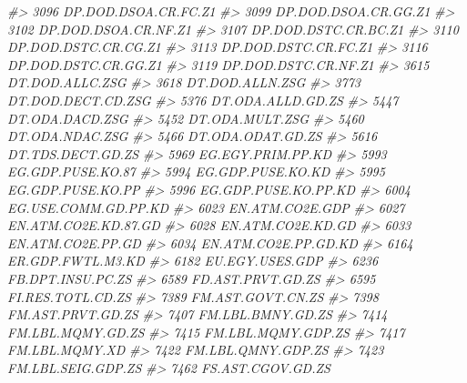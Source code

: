 \documentclass[
]{bxjsbook}
\newenvironment{Shaded}{\begin{snugshade}}{\end{snugshade}}
\newcommand{\CommentTok}[1]{\textcolor[rgb]{0.56,0.35,0.01}{\textit{#1}}}
\theoremstyle{definition}
\theoremstyle{definition}
\theoremstyle{definition}
\theoremstyle{definition}
\theoremstyle{remark}
\begin{document}
\begin{Shaded}
\begin{Highlighting}[]
\CommentTok{\#\textgreater{} 3096        DP.DOD.DSOA.CR.FC.Z1}
\CommentTok{\#\textgreater{} 3099        DP.DOD.DSOA.CR.GG.Z1}
\CommentTok{\#\textgreater{} 3102        DP.DOD.DSOA.CR.NF.Z1}
\CommentTok{\#\textgreater{} 3107        DP.DOD.DSTC.CR.BC.Z1}
\CommentTok{\#\textgreater{} 3110        DP.DOD.DSTC.CR.CG.Z1}
\CommentTok{\#\textgreater{} 3113        DP.DOD.DSTC.CR.FC.Z1}
\CommentTok{\#\textgreater{} 3116        DP.DOD.DSTC.CR.GG.Z1}
\CommentTok{\#\textgreater{} 3119        DP.DOD.DSTC.CR.NF.Z1}
\CommentTok{\#\textgreater{} 3615             DT.DOD.ALLC.ZSG}
\CommentTok{\#\textgreater{} 3618             DT.DOD.ALLN.ZSG}
\CommentTok{\#\textgreater{} 3773          DT.DOD.DECT.CD.ZSG}
\CommentTok{\#\textgreater{} 5376           DT.ODA.ALLD.GD.ZS}
\CommentTok{\#\textgreater{} 5447             DT.ODA.DACD.ZSG}
\CommentTok{\#\textgreater{} 5452             DT.ODA.MULT.ZSG}
\CommentTok{\#\textgreater{} 5460             DT.ODA.NDAC.ZSG}
\CommentTok{\#\textgreater{} 5466           DT.ODA.ODAT.GD.ZS}
\CommentTok{\#\textgreater{} 5616           DT.TDS.DECT.GD.ZS}
\CommentTok{\#\textgreater{} 5969           EG.EGY.PRIM.PP.KD}
\CommentTok{\#\textgreater{} 5993           EG.GDP.PUSE.KO.87}
\CommentTok{\#\textgreater{} 5994           EG.GDP.PUSE.KO.KD}
\CommentTok{\#\textgreater{} 5995           EG.GDP.PUSE.KO.PP}
\CommentTok{\#\textgreater{} 5996        EG.GDP.PUSE.KO.PP.KD}
\CommentTok{\#\textgreater{} 6004        EG.USE.COMM.GD.PP.KD}
\CommentTok{\#\textgreater{} 6023             EN.ATM.CO2E.GDP}
\CommentTok{\#\textgreater{} 6027        EN.ATM.CO2E.KD.87.GD}
\CommentTok{\#\textgreater{} 6028           EN.ATM.CO2E.KD.GD}
\CommentTok{\#\textgreater{} 6033           EN.ATM.CO2E.PP.GD}
\CommentTok{\#\textgreater{} 6034        EN.ATM.CO2E.PP.GD.KD}
\CommentTok{\#\textgreater{} 6164           ER.GDP.FWTL.M3.KD}
\CommentTok{\#\textgreater{} 6182             EU.EGY.USES.GDP}
\CommentTok{\#\textgreater{} 6236           FB.DPT.INSU.PC.ZS}
\CommentTok{\#\textgreater{} 6589           FD.AST.PRVT.GD.ZS}
\CommentTok{\#\textgreater{} 6595           FI.RES.TOTL.CD.ZS}
\CommentTok{\#\textgreater{} 7389           FM.AST.GOVT.CN.ZS}
\CommentTok{\#\textgreater{} 7398           FM.AST.PRVT.GD.ZS}
\CommentTok{\#\textgreater{} 7407           FM.LBL.BMNY.GD.ZS}
\CommentTok{\#\textgreater{} 7414           FM.LBL.MQMY.GD.ZS}
\CommentTok{\#\textgreater{} 7415          FM.LBL.MQMY.GDP.ZS}
\CommentTok{\#\textgreater{} 7417              FM.LBL.MQMY.XD}
\CommentTok{\#\textgreater{} 7422          FM.LBL.QMNY.GDP.ZS}
\CommentTok{\#\textgreater{} 7423          FM.LBL.SEIG.GDP.ZS}
\CommentTok{\#\textgreater{} 7462           FS.AST.CGOV.GD.ZS}

\end{Highlighting}
\end{Shaded}
\end{document}
